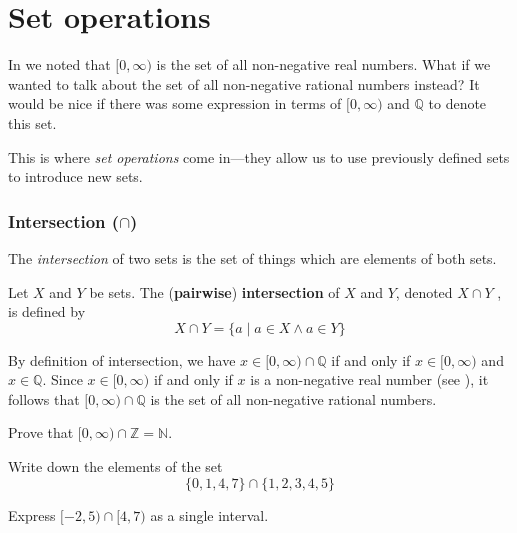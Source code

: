 \section{Set operations}

In  we noted that $[0,\infty)$ is the set of all non-negative real numbers. What if we wanted to talk about the set of all non-negative rational numbers instead? It would be nice if there was some expression in terms of $[0,\infty)$ and $\mathbb{Q}$ to denote this set.

This is where \textit{set operations} come in---they allow us to use previously defined sets to introduce new sets.

\subsubsection*{Intersection ($\cap$)}
The \textit{intersection} of two sets is the set of things which are elements of both sets.

\begin{definition}
\label{defIntersection}
Let $X$ and $Y$ be sets. The (\textbf{pairwise}) \textbf{intersection} of $X$ and $Y$, denoted $X \cap Y$ , is defined by
\[ X \cap Y = \{ a \mid a \in X \wedge a \in Y \} \]
\end{definition}

\begin{example}
By definition of intersection, we have $x \in [0,\infty) \cap \mathbb{Q}$ if and only if $x \in [0,\infty)$ and $x \in \mathbb{Q}$. Since $x \in [0,\infty)$ if and only if $x$ is a non-negative real number (see ), it follows that $[0,\infty) \cap \mathbb{Q}$ is the set of all non-negative rational numbers.
\end{example}

\begin{exercise}
Prove that $[0,\infty) \cap \mathbb{Z} = \mathbb{N}$.
\end{exercise}

\begin{exercise}
Write down the elements of the set
\[ \{ 0, 1, 4, 7 \} \cap \{ 1, 2, 3, 4, 5 \} \]
\end{exercise}

\begin{exercise}
Express $[-2,5) \cap [4,7)$ as a single interval.
\end{exercise}

